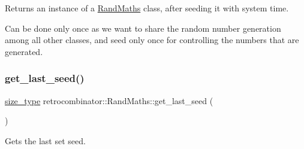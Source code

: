 Returns an instance of a \hyperlink{classretrocombinator_1_1RandMaths}{Rand\+Maths} class, after seeding it with system time. 

Can be done only once as we want to share the random number generation among all other classes, and seed only once for controlling the numbers that are generated. \mbox{\label{classretrocombinator_1_1RandMaths_ae3a186a8f3124cbfc698eeae09b708a0}} 
\subsubsection{\texorpdfstring{get\+\_\+last\+\_\+seed()}{get\_last\_seed()}}
{\footnotesize\ttfamily \hyperlink{constants_8h_a8e1541b50cee66a791df4c437ccbb385}{size\+\_\+type} retrocombinator\+::\+Rand\+Maths\+::get\+\_\+last\+\_\+seed (\begin{DoxyParamCaption}{ }\end{DoxyParamCaption})\hspace{0.3cm}{\ttfamily [inline]}}



Gets the last set seed. 

